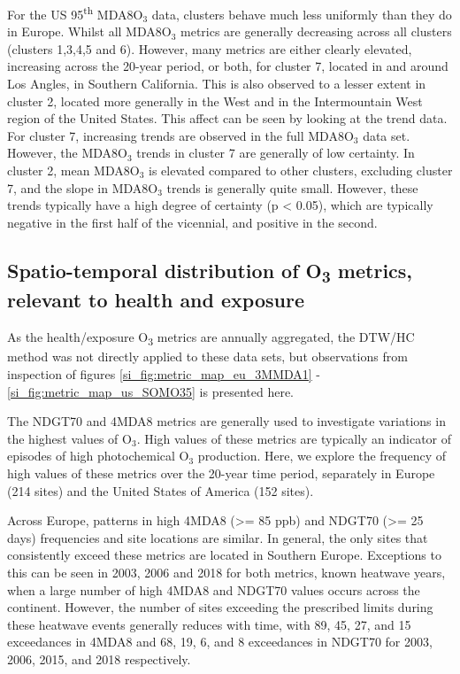 \documentclass[journal abbreviation, manuscript]{copernicus}
\begin{document}
For the US 95\textsuperscript{th} MDA8O$_3$ data, clusters behave much less uniformly than they do in Europe. Whilst all MDA8O$_3$ metrics are generally decreasing across all clusters (clusters 1,3,4,5 and 6). However, many metrics are either clearly elevated, increasing across the 20-year period, or both, for cluster 7, located in and around Los Angles, in Southern California. This is also observed to a lesser extent in cluster 2, located more generally in the West and in the Intermountain West region of the United States. This affect can be seen by looking at the trend data. For cluster 7, increasing trends are observed in the full MDA8O$_3$ data set. However, the MDA8O$_3$ trends in cluster 7 are generally of low certainty. In cluster 2, mean MDA8O$_3$ is elevated compared to other clusters, excluding cluster 7, and the slope in MDA8O$_3$ trends is generally quite small. However, these trends typically have a high degree of certainty (p < 0.05), which are typically negative in the first half of the vicennial, and positive in the second. 

\subsection{Spatio-temporal distribution of O\textsubscript{3} metrics, relevant to health and exposure} \label{sect:metrics_distribution}

As the health/exposure O\textsubscript{3} metrics are annually aggregated, the DTW/HC method was not directly applied to these data sets, but observations from inspection of figures \ref{si_fig:metric_map_eu_3MMDA1} - \ref{si_fig:metric_map_us_SOMO35} is presented here. 

The NDGT70 and 4MDA8 metrics are generally used to investigate variations in the highest values of O$_3$. High values of these metrics are typically an indicator of episodes of high photochemical O$_3$ production. Here, we explore the frequency of high values of these metrics over the 20-year time period, separately in Europe (214 sites) and the United States of America (152 sites).

Across Europe, patterns in high 4MDA8 (>= 85 ppb) and NDGT70 (>= 25 days) frequencies and site locations are similar. In general, the only sites that consistently exceed these metrics are located in Southern Europe. Exceptions to this can be seen in 2003, 2006 and 2018 for both metrics, known heatwave years, when a large number of high 4MDA8 and NDGT70 values occurs across the continent. However, the number of sites exceeding the prescribed limits during these heatwave events generally reduces with time, with 89, 45, 27, and 15 exceedances in 4MDA8 and 68, 19, 6, and 8 exceedances in NDGT70 for 2003, 2006, 2015, and 2018 respectively.
\end{document}
